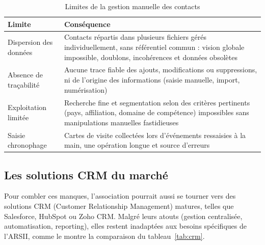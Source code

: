 \begin{table}[H]
\centering
\small
\begin{tabularx}{\textwidth}{|l|X|}
\hline
\textbf{Limite} & \textbf{Conséquence} \\
\hline
Dispersion des données & Contacts répartis dans plusieurs fichiers gérés individuellement, sans référentiel commun : vision globale impossible, doublons, incohérences et données obsolètes \\
\hline
Absence de traçabilité & Aucune trace fiable des ajouts, modifications ou suppressions, ni de l'origine des informations (saisie manuelle, import, numérisation) \\
\hline
Exploitation limitée & Recherche fine et segmentation selon des critères pertinents (pays, affiliation, domaine de compétence) impossibles sans manipulations manuelles fastidieuses \\
\hline
Saisie chronophage & Cartes de visite collectées lors d'événements ressaisies à la main, une opération longue et source d'erreurs \\
\hline
\end{tabularx}
\caption{Limites de la gestion manuelle des contacts}
\label{tab:limites-manuelles}
\end{table}

\subsection{Les solutions CRM du marché}

Pour combler ces manques, l'association pourrait aussi se tourner vers des solutions CRM (Customer Relationship Management) matures, telles que Salesforce, HubSpot ou Zoho CRM. Malgré leurs atouts (gestion centralisée, automatisation, reporting), elles restent inadaptées aux besoins spécifiques de l'ARSII, comme le montre la comparaison du tableau~\ref{tab:crm}.

